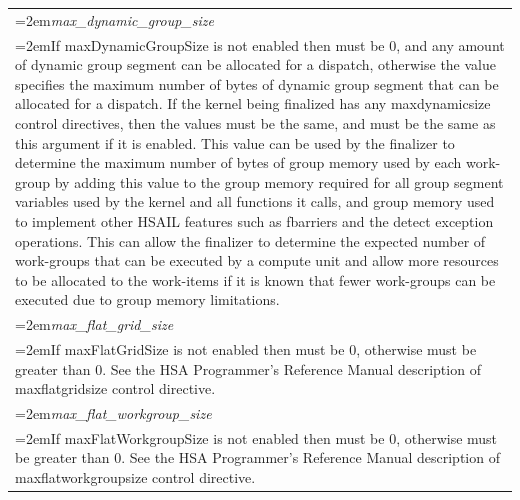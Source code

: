 \documentclass[final,oneside]{book}
\newcommand{\reffld}[1]{\textit{#1}}
\begin{document}
\begin{longtable}{@{}>{\hangindent=2em}p{\textwidth}}
\hypertarget{hsa_\-ext_\-control_\-directives_\-t.max_\-dynamic_\-group_\-size}{\reffld{max_\-dynamic_\-group_\-size}}\\\hspace{2em}If maxDynamicGroupSize is not enabled then must be 0, and any amount of dynamic group segment can be allocated for a dispatch, otherwise the value specifies the maximum number of bytes of dynamic group segment that can be allocated for a dispatch. If the kernel being finalized has any maxdynamicsize control directives, then the values must be the same, and must be the same as this argument if it is enabled. This value can be used by the finalizer to determine the maximum number of bytes of group memory used by each work-group by adding this value to the group memory required for all group segment variables used by the kernel and all functions it calls, and group memory used to implement other HSAIL features such as fbarriers and the detect exception operations. This can allow the finalizer to determine the expected number of work-groups that can be executed by a compute unit and allow more resources to be allocated to the work-items if it is known that fewer work-groups can be executed due to group memory limitations.\\[2mm]
\hypertarget{hsa_\-ext_\-control_\-directives_\-t.max_\-flat_\-grid_\-size}{\reffld{max_\-flat_\-grid_\-size}}\\\hspace{2em}If maxFlatGridSize is not enabled then must be 0, otherwise must be greater than 0. See the HSA Programmer's Reference Manual description of maxflatgridsize control directive.\\[2mm]
\hypertarget{hsa_\-ext_\-control_\-directives_\-t.max_\-flat_\-workgroup_\-size}{\reffld{max_\-flat_\-workgroup_\-size}}\\\hspace{2em}If maxFlatWorkgroupSize is not enabled then must be 0, otherwise must be greater than 0. See the HSA Programmer's Reference Manual description of maxflatworkgroupsize control directive.\\[2mm]

\end{longtable}
\end{document}
